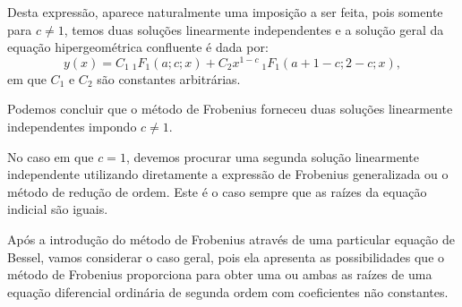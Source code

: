 {Desta expressão, aparece naturalmente uma imposição a ser feita, pois somente para $c \ne 1$, temos duas soluções linearmente independentes e a solução geral da equação hipergeométrica confluente é dada por:
$$y(x) = C_1\ {}_1F_1(a; c; x) + C_2 x^{1-c}\ {}_1F_1(a+1-c; 2-c; x),$$
em que $C_1$ e $C_2$ são constantes arbitrárias.

Podemos concluir que o método de Frobenius forneceu duas soluções linearmente independentes impondo $c \ne 1$.

No caso em que $c = 1$, devemos procurar uma segunda solução linearmente independente utilizando diretamente a expressão de Frobenius generalizada ou o método de redução de ordem. Este é o caso sempre que as raízes da equação indicial são iguais.
}






Após a introdução do método de Frobenius através de uma particular equação de Bessel, vamos considerar o caso geral, pois ela apresenta as possibilidades que o método de Frobenius proporciona para obter uma ou ambas as raízes de uma equação diferencial ordinária de segunda ordem com coeficientes não constantes.


